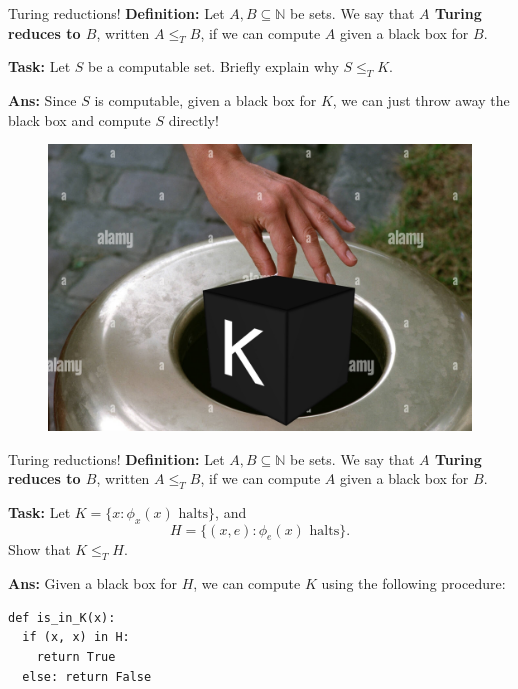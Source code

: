 \documentclass{beamer}
\newcommand{\N}{\mathbb N}
\begin{document}
\begin{frame}{Turing reductions!}
\textbf{Definition:} Let $A, B \subseteq \N$ be sets. We say that \textbf{$A$ Turing reduces to $B$}, written $A \leq_T B$, if we can compute $A$ given a black box for $B$.

\vspace{2mm}

\textbf{Task:} Let $S$ be a computable set. Briefly explain why $S \leq_T K$.

\pause

\textbf{Ans:} Since $S$ is computable, given a black box for $K$, we can just throw away the black box and compute $S$ directly!
\begin{figure}[h]
    \centering
    \includegraphics[scale=0.5]{img/trash.jpg}
\end{figure}

\end{frame}

\begin{frame}[fragile]{Turing reductions!}
\textbf{Definition:} Let $A, B \subseteq \N$ be sets. We say that \textbf{$A$ Turing reduces to $B$}, written $A \leq_T B$, if we can compute $A$ given a black box for $B$.

\vspace{2mm}

\textbf{Task:} Let $K = \{x: \phi_x(x) \text{ halts}\}$, and 
$$H = \{(x, e): \phi_e(x) \text{ halts}\}.$$
Show that $K \leq_T H$.

\pause

\textbf{Ans:} Given a black box for $H$, we can compute $K$ using the following procedure:
\begin{verbatim}
def is_in_K(x):
  if (x, x) in H:
    return True
  else: return False
\end{verbatim}

\end{frame}
\end{document}
